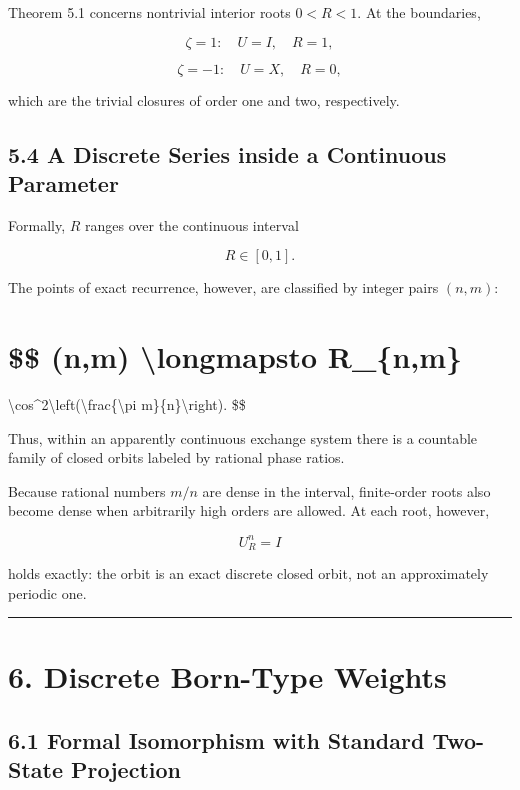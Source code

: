\documentclass[
  a4paper,
  10pt]{article}
\begin{document}
Theorem 5.1 concerns nontrivial interior roots \(0<R<1\). At the
boundaries,

\[
\zeta=1:\quad U=I,\quad R=1,
\]

\[
\zeta=-1:\quad U=X,\quad R=0,
\]

which are the trivial closures of order one and two, respectively.

\subsection{5.4 A Discrete Series inside a Continuous
Parameter}\label{54-a-discrete-series-inside-a-continuous-parameter}

Formally, \(R\) ranges over the continuous interval

\[
R\in[0,1].
\]

The points of exact recurrence, however, are classified by integer pairs
\((n,m)\):

\section{\$\$ (n,m) \textbackslash longmapsto
R\_\{n,m\}}\label{-nm-longmapsto-r_nm}

\textbackslash cos\^{}2\textbackslash left(\textbackslash frac\{\textbackslash pi
m\}\{n\}\textbackslash right). \$\$

Thus, within an apparently continuous exchange system there is a
countable family of closed orbits labeled by rational phase ratios.

Because rational numbers \(m/n\) are dense in the interval, finite-order
roots also become dense when arbitrarily high orders are allowed. At
each root, however,

\[
U_R^n=I
\]

holds exactly: the orbit is an exact discrete closed orbit, not an
approximately periodic one.

\begin{center}\rule{0.5\linewidth}{0.5pt}\end{center}

\section{6. Discrete Born-Type
Weights}\label{6-discrete-born-type-weights}

\subsection{6.1 Formal Isomorphism with Standard Two-State
Projection}\label{61-formal-isomorphism-with-standard-two-state-projection}
\end{document}

